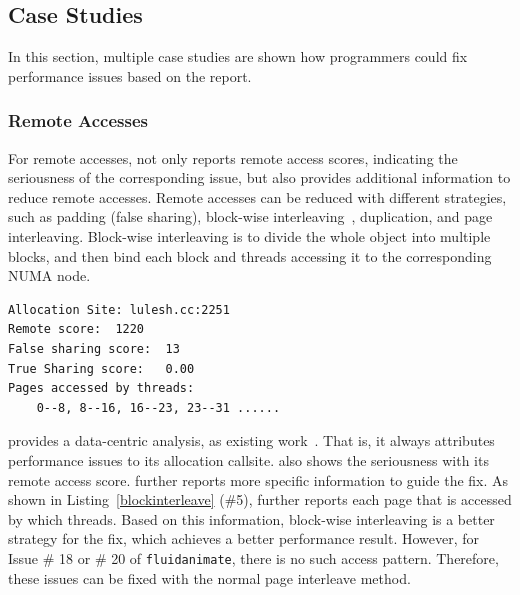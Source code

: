 \subsection{Case Studies}
\label{sec:casestudies}
In this section, multiple case studies are shown how programmers could fix performance issues based on the report. 



\subsubsection{Remote Accesses}

For remote accesses, \NP{}  not only reports remote access scores, indicating the seriousness of the corresponding issue, but also provides additional information to reduce remote accesses. Remote accesses can be reduced with different strategies, such as padding (false sharing), block-wise interleaving~\cite{XuNuma}, duplication, and page interleaving. Block-wise interleaving is to divide the whole object into multiple blocks, and then bind each block and threads accessing it to the corresponding NUMA node.  




\begin{lstlisting}[caption={Remote access issue of lulesh },label={blockinterleave},captionpos=b]
Allocation Site: lulesh.cc:2251
Remote score:  1220
False sharing score:  13
True Sharing score:   0.00
Pages accessed by threads:
    0--8, 8--16, 16--23, 23--31 ......
\end{lstlisting}
\NP{} provides a data-centric analysis, as existing work~\cite{XuNuma}. That is, it always attributes performance issues to its allocation callsite. \NP{} also shows the seriousness with its remote access score. 
\NP{} further reports more specific information to guide the fix. As shown in  Listing~\ref{blockinterleave} (\#5), \NP{} further reports each page that is accessed by which threads. Based on this information,  block-wise interleaving is a better strategy for the fix, which achieves a better performance result. However, for Issue \# 18 or \# 20 of \texttt{fluidanimate}, there is no such access pattern. Therefore, these issues can be fixed with the normal page interleave method. 

